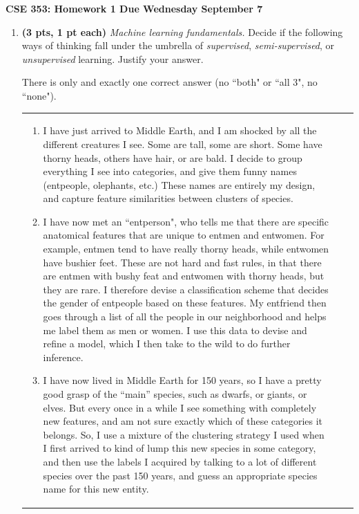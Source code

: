 \documentclass{article}
\newcommand{\mypagebreak}{\begin{center}
		\noindent\makebox[\linewidth]{\rule{7.5in}{1pt}}
	\end{center}}
\newcommand{\showpoints}[1]{\textbf{(#1)}}
\begin{document}
{\Large\textbf{CSE 353: Homework 1 \hfill
Due Wednesday September 7}}


\mypagebreak

\begin{enumerate}

\item \showpoints{3 pts, 1 pt each} \emph{Machine learning fundamentals.}
Decide if the following ways of thinking fall under the umbrella of \emph{supervised}, \emph{semi-supervised}, or \emph{unsupervised} learning. Justify your answer. 

There is only and exactly one correct answer (no ``both" or ``all 3", no ``none"). 

\begin{tabular}{lcl}
\begin{minipage}{.6\textwidth}
\begin{enumerate}
\item I have just arrived to Middle Earth, and I am shocked by all the different creatures I see. Some are tall, some are short. Some have thorny heads, others have hair, or are bald. I decide to group everything I see into categories, and give them funny names (entpeople, olephants, etc.) These names are entirely my design, and capture feature similarities between clusters of species.




\item I have now met an ``entperson", who tells me that there are specific anatomical features that are unique to entmen and entwomen. For example, entmen tend to have really thorny heads, while entwomen have bushier feet. These are not hard and fast rules, in that there are entmen with bushy feat and entwomen with thorny heads, but they are rare. I therefore devise a classification scheme that decides the gender of entpeople based on these features. My entfriend then goes through a list of all the people in our neighborhood and helps me label them as men or women. I use this data to devise and refine a model, which I then take to the wild to do further inference.



\item I have now lived in Middle Earth for 150 years, so I have a pretty good grasp of the ``main'' species, such as dwarfs, or giants, or elves. But every once in a while I see something with completely new features, and am not sure exactly which of these categories it belongs. So, I use a mixture of the clustering strategy I used when I first arrived to kind of lump this new species in some category, and then use the labels I acquired by talking to a lot of different species over the past 150 years, and guess an appropriate species name for this new entity.




\end{enumerate}
\end{minipage}
\end{tabular}
\end{enumerate}
\end{document}
